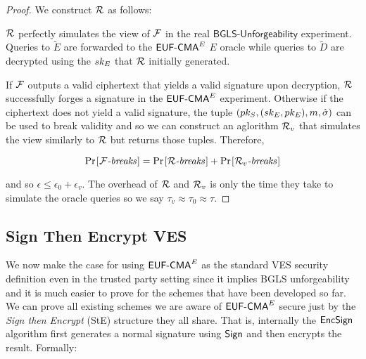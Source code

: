 \begin{proof}
  We construct $\mathcal{R}$ as follows:

\begin{center}
\end{center}


$\mathcal{R}$ perfectly simulates the view of $\mathcal{F}$ in the real $\textsf{BGLS-Unforgeability}$ experiment.
Queries to $\tilde{E}$ are forwarded to the $\textsf{EUF-CMA}^E$ $E$ oracle while queries to $\tilde{D}$ are decrypted using the $sk_E$ that $\mathcal{R}$ initially generated.

If $\mathcal{F}$ outputs a valid ciphertext that yields a valid signature upon decryption, $\mathcal{R}$ successfully forges a signature in the $\textsf{EUF-CMA}^E$ experiment.
Otherwise if the ciphertext does not yield a valid signature, the tuple $(pk_S,(sk_E, pk_E),m, \hat{\sigma})$ can be used to break validity and so we can construct an aglorithm $\mathcal{R}_v$ that simulates the view similarly to $\mathcal{R}$ but returns those tuples. Therefore,

\[  \prob{\textit{$\F$-breaks}} = \prob{\textit{$\R$-breaks}} + \prob{\textit{$\R_v$-breaks}} \]

and so $\epsilon \leq \epsilon_0 + \epsilon_v$.
The overhead of $\mathcal{R}$ and $\mathcal{R}_v$ is only the time they take to simulate the oracle queries so we say $\tau_v \approx \tau_0 \approx \tau$.
\end{proof}


\subsection{Sign Then Encrypt VES}

We now make the case for using $\textsf{EUF-CMA}^E$ as the standard VES security definition even in the trusted party setting since it implies BGLS unforgeability and it is much easier to prove for the schemes that have been developed so far.
We can prove all existing schemes we are aware of \cite{Boneh:2003:AVE:1766171.1766207, Ruckert:2009:SVE:1615384.1615387, waters-ves, SHAO20081961, VES-structure-preserving} $\textsf{EUF-CMA}^E$ secure just by the \emph{Sign then Encrypt} (StE) structure they all share.
That is, internally the $\textsf{EncSign}$ algorithm first generates a normal signature using $\textsf{Sign}$ and then encrypts the result. Formally:

